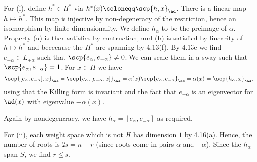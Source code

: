 For (i), define $h^* \in H^*$ via $h^*(x)\coloneqq \scp{h, x}_{\ad}$.
There is a linear map $h\mapsto h^*$. This map is injective by
non-degeneracy of the restriction, hence an isomorphism by finite-dimensionality.
We define  $h_\alpha$ to be the preimage of $\alpha$. Property (a) is then
satisfies by contruction, and (b) is satisfied by linearity of $h\mapsto h^*$ and
bececause the $H^*$ are spanning by 4.13(f). By 4.13e we find
$e_{\pm\alpha} \in L_{\pm\alpha}$ such that $\scp{e_\alpha, e_{-\alpha}}\neq 0$.
We can scale them in a sway such that $\scp{e_\alpha, e_{-\alpha}} = 1$.
For $x \in H$ we have
\[ \scp{[e_\alpha, e_{-\alpha}], x}_{\ad} = \scp{e_\alpha, [e_{-\alpha}, x]}_{\ad}
= \alpha(x)\scp{e_\alpha, e_{-\alpha}}_{\ad} = \alpha(x) = \scp{h_\alpha, x}_{\ad}, \]
using that the Killing form is invariant and the fact that $e_{-\alpha}$ is an
eigenvector for $\ad(x)$ with eigenvalue $-\alpha(x)$.

Again by nondegeneracy, we have $h_\alpha = [e_\alpha, e_{-\alpha}]$ as required.

For (ii), each weight space which is not $H$ has dimension $1$ by 4.16(a). Hence,
the number of roots is $2s = n - r$ (since roots come in pairs  $\alpha$ and $-\alpha$).
Since the $h_\alpha$ span $S$, we find $r\leq s$.
